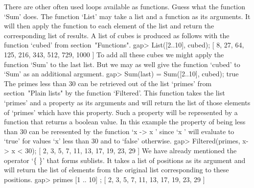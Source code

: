 There are other often used loops available as functions.   Guess what the
function `Sum' does.  The function `List' may  take a list and a function
as its arguments.  It will then apply the function to each element of the
list  and return  the corresponding list of results.   A list of cubes is
produced as follows with the function `cubed' from section~"Functions".
\beginexample
    gap> List([2..10], cubed);
    [ 8, 27, 64, 125, 216, 343, 512, 729, 1000 ] 
\endexample
To add all these cubes  we might apply the  function  `Sum' to  the  last
list.  But we may  as well  give the  function  `cubed' to  `Sum'  as  an
additional argument.
\beginexample
    gap> Sum(last) = Sum([2..10], cubed);
    true 
\endexample
The  primes less than 30 can  be retrieved out  of the list `primes' from
section~"Plain lists" by the function `Filtered'. This function takes the
list `primes' and a property as its arguments and will return the list of
those elements of `primes' which have this property. Such a property will
be represented  by  a function  that  returns  a boolean  value. In  this
example the property  of  being less than  30  can be reresented  by  the
function `x  -> x ' since `x ' will evaluate to `true'  for
values `x' less than 30 and to `false' otherwise.
\beginexample
    gap> Filtered(primes, x-> x < 30);
    [ 2, 3, 5, 7, 11, 13, 17, 19, 23, 29 ] 
\endexample
We have already  mentioned the operator `\{  \}' that  forms sublists. It
takes a  list of positions  as its argument  and will return  the list of
elements from the original list corresponding to these positions.
\beginexample
    gap> primes{ [1 .. 10] };
    [ 2, 3, 5, 7, 11, 13, 17, 19, 23, 29 ] 
\endexample


